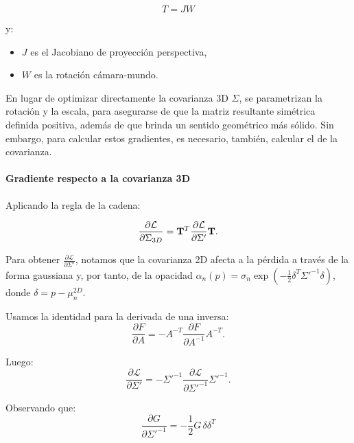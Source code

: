 \begin{equation}
T = J W
\end{equation}

\noindent y:
\begin{itemize}
    \item $J$ es el Jacobiano de proyección perspectiva,
    \item $W$ es la rotación cámara-mundo.
\end{itemize}

En lugar de optimizar directamente la covarianza 3D $\Sigma$, se parametrizan la rotación y la escala, para asegurarse de que la matriz resultante simétrica definida positiva, además de que brinda un sentido geométrico más sólido. Sin embargo, para calcular estos gradientes, es necesario, también, calcular el de la covarianza.

\paragraph{Gradiente respecto a la covarianza 3D}

Aplicando la regla de la cadena:

\begin{equation}
\frac{\partial \mathcal{L}}{\partial \Sigma_{3D}}
=
\mathbf{T}^T
\frac{\partial \mathcal{L}}{\partial \Sigma'}
\mathbf{T}.
\end{equation}

Para obtener $\frac{\partial \mathcal{L}}{\partial \Sigma'}$, notamos que la covarianza 2D afecta a la pérdida a través de la forma gaussiana y, por tanto, de la opacidad $\alpha_n(p) = \sigma_n \exp(-\frac{1}{2}\delta^T \Sigma'^{-1} \delta)$, donde $\delta = p - \mu_n^{2D}$.

Usamos la identidad para la derivada de una inversa:
\begin{equation}
\frac{\partial F}{\partial A}
=
- A^{-T}
\frac{\partial F}{\partial A^{-1}}
A^{-T}.
\end{equation}

Luego:
\begin{equation}
\frac{\partial \mathcal{L}}{\partial \Sigma'} = - \Sigma'^{-1} \frac{\partial \mathcal{L}}{\partial \Sigma'^{-1}} \Sigma'^{-1}.
\end{equation}

Observando que:
\begin{equation}
\frac{\partial G}{\partial \Sigma'^{-1}} = -\frac{1}{2} G \, \delta \delta^T
\end{equation}

